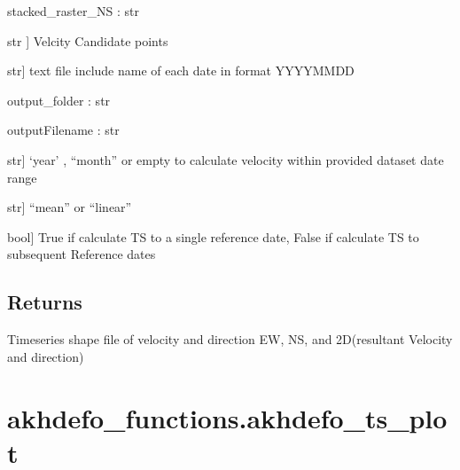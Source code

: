 \documentclass[letterpaper,10pt]{sphinxmanual}
\begin{document}
\begin{fulllineitems}
\sphinxAtStartPar
stacked\_raster\_NS : str
\begin{description}
\sphinxlineitem{velocity\_points}{[}str {]}
\sphinxAtStartPar
Velcity Candidate points

\sphinxlineitem{dates\_name}{[}str{]}
\sphinxAtStartPar
text file include name of each date in format YYYYMMDD

\end{description}

\sphinxAtStartPar
output\_folder : str

\sphinxAtStartPar
outputFilename : str
\begin{description}
\sphinxlineitem{VEL\_Scale}{[}str{]}
\sphinxAtStartPar
‘year’ , “month” or empty  to calculate velocity within provided dataset date range

\sphinxlineitem{velocity\_mode}{[}str{]}
\sphinxAtStartPar
“mean” or “linear”

\sphinxlineitem{master\_reference}{[}bool{]}
\sphinxAtStartPar
True if calculate TS to a single reference date, False if calculate TS to subsequent Reference dates

\end{description}


\section{Returns}
\label{\detokenize{generated/akhdefo_functions.Time_Series:returns}}
\sphinxAtStartPar
Time\sphinxhyphen{}series shape file of velocity and direction EW, NS, and 2D(resultant Velocity and direction)

\end{fulllineitems}


\sphinxstepscope


\chapter{akhdefo\_functions.akhdefo\_ts\_plot}
\label{\detokenize{generated/akhdefo_functions.akhdefo_ts_plot:akhdefo-functions-akhdefo-ts-plot}}\label{\detokenize{generated/akhdefo_functions.akhdefo_ts_plot::doc}}
\end{document}

